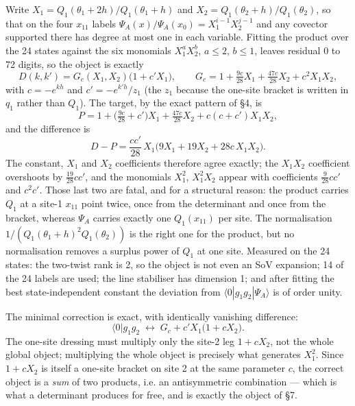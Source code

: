\documentclass[11pt]{article}
\newcommand{\ket}[1]{|#1\rangle}
\newcommand{\vac}{\langle 0|}
\begin{document}
Write $X_1=Q_1(\theta_1+2h)/Q_1(\theta_1+h)$ and $X_2=Q_1(\theta_2+h)/Q_1(\theta_2)$, so that on the four
$x_{11}$ labels $\Psi_A(x)/\Psi_A(x_0)=X_1^{i-1}X_2^{j-1}$ and any covector supported there has degree
at most one in each variable. Fitting the product over the 24 states against the six monomials
$X_1^aX_2^b$, $a\le2$, $b\le1$, leaves residual $0$ to 72 digits, so the object is exactly
\begin{equation}
D(k,k')=G_c(X_1,X_2)\big(1+c'X_1\big),\qquad
G_c=1+\tfrac{9c}{28}X_1+\tfrac{47c}{28}X_2+c^2X_1X_2,
\end{equation}
with $c=-e^{kh}$ and $c'=-e^{k'h}/z_1$ (the $z_1$ because the one-site bracket is written in $q_1$
rather than $Q_1$). The target, by the exact pattern of \S4, is
\begin{equation}
P=1+\Big(\tfrac{9c}{28}+c'\Big)X_1+\tfrac{47c}{28}X_2+c(c+c')X_1X_2,
\end{equation}
and the difference is
\begin{equation}
D-P=\frac{cc'}{28}\,X_1\big(9X_1+19X_2+28c\,X_1X_2\big).
\end{equation}
The constant, $X_1$ and $X_2$ coefficients therefore agree exactly; the $X_1X_2$ coefficient overshoots
by $\tfrac{19}{28}cc'$, and the monomials $X_1^2$, $X_1^2X_2$ appear with coefficients
$\tfrac{9}{28}cc'$ and $c^2c'$. Those last two are fatal, and for a structural reason: the product
carries $Q_1$ at a site-1 $x_{11}$ point twice, once from the determinant and once from the bracket,
whereas $\Psi_A$ carries exactly one $Q_1(x_{11})$ per site. The normalisation
$1/(Q_1(\theta_1+h)^2Q_1(\theta_2))$ is the right one for the product, but no normalisation removes a
surplus power of $Q_1$ at one site. Measured on the 24 states: the two-twist rank is 2, so the object
is not even an SoV expansion; 14 of the 24 labels are used; the line stabiliser has dimension 1; and
after fitting the best state-independent constant the deviation from $\vac g_1g_2\ket{\Psi_A}$ is of
order unity.

The minimal correction is exact, with identically vanishing difference:
\begin{equation}
\vac g_1g_2 \;\longleftrightarrow\; G_c+c'X_1\big(1+cX_2\big).
\end{equation}
The one-site dressing must multiply only the site-2 leg $1+cX_2$, not the whole global object;
multiplying the whole object is precisely what generates $X_1^2$. Since $1+cX_2$ is itself a one-site
bracket on site 2 at the same parameter $c$, the correct object is a \emph{sum} of two products, i.e.
an antisymmetric combination --- which is what a determinant produces for free, and is exactly the
object of \S7.
\end{document}
